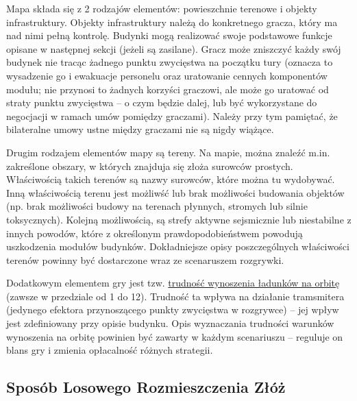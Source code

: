 \documentclass[11pt,a4paper]{article}
\begin{document}
Mapa składa się z 2 rodzajów elementów: powieszchnie terenowe i objekty infrastruktury. Objekty infrastruktury należą do konkretnego gracza, który ma nad nimi pełną kontrolę. Budynki mogą realizować swoje podstawowe funkcje opisane w następnej sekcji (jeżeli są zasilane). Gracz może zniszczyć każdy swój budynek nie tracąc żadnego punktu zwycięstwa na początku tury (oznacza to wysadzenie go i ewakuacje personelu oraz uratowanie cennych komponentów modułu; nie przynosi to żadnych korzyści graczowi, ale może go uratować od straty punktu zwycięstwa -- o czym będzie dalej, lub być wykorzystane do negocjacji w ramach umów pomiędzy graczami). Należy przy tym pamiętać, że bilateralne umowy ustne między graczami nie są nigdy wiążące.

Drugim rodzajem elementów mapy są tereny. Na mapie, można znaleźć m.in. zakreślone obszary, w których znajduja się złoża surowców prostych. Właściwością takich terenów są nazwy surowców, które można tu wydobywać. Inną właściwością terenu jest możliwść lub brak możliwości budowania objektów (np. brak możliwości budowy na terenach płynnych, stromych lub silnie toksycznych). Kolejną możliwością, są strefy aktywne sejsmicznie lub niestabilne z innych powodów, które z określonym prawdopodobieństwem powodują uszkodzenia modułów budynków. Dokładniejsze opisy poszczególnych właściwości terenów powinny być dostarczone wraz ze scenaruszem rozgrywki.

Dodatkowym elementem gry jest tzw. \underline{trudność wynoszenia ładunków na orbitę} (zawsze w przedziale od 1 do 12). Trudność ta wpływa na działanie tramsmitera (jedynego efektora przynoszącego punkty zwycięstwa w rozgrywce) -- jej wpływ jest zdefiniowany przy opisie budynku. Opis wyznaczania trudności warunków wynoszenia na orbitę powinien być zawarty w każdym scenariuszu -- reguluje on blans gry i zmienia opłacalność różnych strategii.

\newpage

\subsection{Sposób Losowego Rozmieszczenia Złóż}
\end{document}
